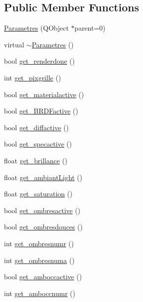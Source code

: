 \subsection*{Public Member Functions}
\begin{DoxyCompactItemize}
\item 
\hyperlink{class_parametres_a6a6a5bb49949914fdfe977178ebd953a}{Parametres} (QObject $\ast$parent=0)
\item 
virtual \hyperlink{class_parametres_aca179db31f6a3856cbd2945a8133109b}{$\sim$Parametres} ()
\item 
bool \hyperlink{class_parametres_adc7d6eb7b6a62666ad22f81729a3989f}{get\_\-renderdone} ()
\item 
int \hyperlink{class_parametres_a00cbd2fea9fcc5d9288cfaf24ff17a49}{get\_\-pixgrille} ()
\item 
bool \hyperlink{class_parametres_a0e31b234e6bc1959c8f6f16f5786214b}{get\_\-materialactive} ()
\item 
bool \hyperlink{class_parametres_aa418f7387004508a7f07567cce4c9081}{get\_\-BRDFactive} ()
\item 
bool \hyperlink{class_parametres_a02303ef51a9f3942134932186815e35d}{get\_\-diffactive} ()
\item 
bool \hyperlink{class_parametres_ad7f074c9be240e8b6b9b7ea52c900f6f}{get\_\-specactive} ()
\item 
float \hyperlink{class_parametres_ac31e2d824e16ca40fd437edfe17bf05e}{get\_\-brillance} ()
\item 
float \hyperlink{class_parametres_abb90eb326ba23eaf17a5a62e3dfd1288}{get\_\-ambiantLight} ()
\item 
float \hyperlink{class_parametres_afc7f64ed128bcd9a3dbec7e955dde1c4}{get\_\-saturation} ()
\item 
bool \hyperlink{class_parametres_a4c86c1342c7be51975c5d1c11c9a5db4}{get\_\-ombresactive} ()
\item 
bool \hyperlink{class_parametres_a3ee0b77acd375580b468862aefa98688}{get\_\-ombresdouces} ()
\item 
int \hyperlink{class_parametres_a2b54d04b69c844a370fee57120cc3b3b}{get\_\-ombresnumr} ()
\item 
int \hyperlink{class_parametres_a1487e008f5b781f3d307ff579a0ad5c6}{get\_\-ombresnuma} ()
\item 
bool \hyperlink{class_parametres_a1c6ef7c75429dde0dccd85e25041b47b}{get\_\-amboccactive} ()
\item 
int \hyperlink{class_parametres_a2cd522560d3e202264d99bcd2cff650e}{get\_\-amboccnumr} ()

\end{DoxyCompactItemize}
